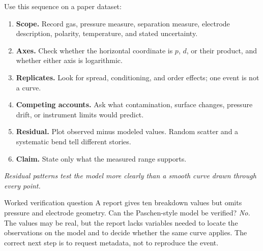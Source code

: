 Use this sequence on a paper dataset:
\begin{enumerate}[leftmargin=*]
\item \textbf{Scope.} Record gas, pressure measure, separation measure,
electrode description, polarity, temperature, and stated uncertainty.
\item \textbf{Axes.} Check whether the horizontal coordinate is \(p\), \(d\),
or their product, and whether either axis is logarithmic.
\item \textbf{Replicates.} Look for spread, conditioning, and order effects;
one event is not a curve.
\item \textbf{Competing accounts.} Ask what contamination, surface changes,
pressure drift, or instrument limits would predict.
\item \textbf{Residual.} Plot observed minus modeled values. Random scatter and
a systematic bend tell different stories.
\item \textbf{Claim.} State only what the measured range supports.
\end{enumerate}

\begin{center}
\par\footnotesize\emph{Residual patterns test the model more clearly than a
smooth curve drawn through every point.}
\end{center}

\begin{teloscard}{Worked verification question}
A report gives ten breakdown values but omits pressure and electrode geometry.
Can the Paschen-style model be verified? \emph{No.} The values may be real, but
the report lacks variables needed to locate the observations on the model and
to decide whether the same curve applies. The correct next step is to request
metadata, not to reproduce the event.
\end{teloscard}

